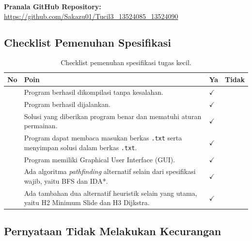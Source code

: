 \documentclass[11pt,a4paper]{article}
\begin{document}
\textbf{Pranala GitHub Repository:} \\
\url{https://github.com/Sakazu01/Tucil3_13524085_13524090}

\subsection*{Checklist Pemenuhan Spesifikasi}

\begin{table}[H]
\centering
\renewcommand{\arraystretch}{1.45}
\setlength{\tabcolsep}{8pt}
\begin{tabularx}{0.95\textwidth}{|>{\centering\arraybackslash}p{0.8cm}|Y|>{\centering\arraybackslash}p{1.7cm}|>{\centering\arraybackslash}p{1.7cm}|}
\hline
\textbf{No} & \centering\arraybackslash\textbf{Poin} & \textbf{Ya} & \textbf{Tidak} \\
 & Program berhasil dikompilasi tanpa kesalahan. & \(\checkmark\) & \\
 & Program berhasil dijalankan. & \(\checkmark\) & \\
 & Solusi yang diberikan program benar dan mematuhi aturan permainan. & \(\checkmark\) & \\
 & Program dapat membaca masukan berkas \texttt{.txt} serta menyimpan solusi dalam berkas \texttt{.txt}. & \(\checkmark\) & \\
 & Program memiliki Graphical User Interface (GUI). & \(\checkmark\) & \\
 & Ada algoritma \textit{pathfinding} alternatif selain dari spesifikasi wajib, yaitu BFS dan IDA*. & \(\checkmark\) & \\
 & Ada tambahan dua alternatif heuristik selain yang utama, yaitu H2 Minimum Slide dan H3 Dijkstra. & \(\checkmark\) & \\
\hline
\end{tabularx}
\caption{Checklist pemenuhan spesifikasi tugas kecil.}
\end{table}

\subsection*{Pernyataan Tidak Melakukan Kecurangan}
\end{document}
